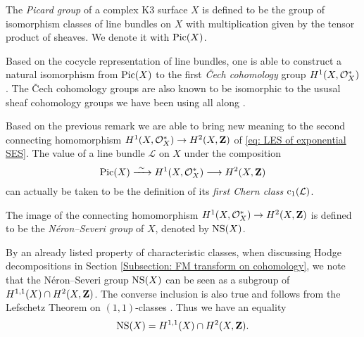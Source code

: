 \begin{definition}
    The \emph{Picard group} of a complex K3 surface $X$ is defined to be the group of isomorphism classes of line bundles on $X$ with multiplication given by the tensor product of sheaves. We denote it with $\operatorname{Pic}(X)$.
\end{definition}

\begin{remark}
    Based on the cocycle representation of line bundles, one is able to construct a natural isomorphism from $\operatorname{Pic}(X)$ to the first \emph{Čech cohomology} group $H^1(X,\mathcal O_X^*)$ \cite[\S 4, Theorem 4.49]{Voisin2002}.
    The Čech cohomology groups are also known to be isomorphic to the ususal sheaf cohomology groups we have been using all along \cite[\S 4, Theorem 4.44]{Voisin2002}.
\end{remark}

Based on the previous remark we are able to bring new meaning to the second connecting homomorphism $H^{1}(X, \mathcal O_X^*) \to H^{2}(X, \mathbf Z)$ of \eqref{eq: LES of exponential SES}. 
The value of a line bundle $\mathcal L$ on $X$ under the composition
\[
    \operatorname{Pic}(X) \xrightarrow{\ \sim \ } H^{1}(X, \mathcal O_X^*) \longrightarrow H^{2}(X, \mathbf Z)
\]
can actually be taken to be the definition of its \emph{first Chern class} $\cclass[1]{\mathcal L}$.
\begin{definition}
    The image of the connecting homomorphism $H^{1}(X, \mathcal O_X^*) \to H^{2}(X, \mathbf Z)$ is defined to be the \emph{Néron--Severi group} of $X$, denoted by $\operatorname{NS}(X)$. 
\end{definition}

\begin{remark}
    By an already listed property of characteristic classes, when discussing Hodge decompositions in Section \ref{Subsection: FM transform on cohomology}, we note that the Néron--Severi group $\operatorname{NS}(X)$ can be seen as a subgroup of $H^{1,1}(X) \cap H^{2}(X, \mathbf Z)$. The converse inclusion is also true and follows from the Lefschetz Theorem on $(1,1)$-classes \cite[\S 1.2]{GriffithsHarris1994}. Thus we have an equality
    \begin{equation}
        \label{eq: NS = 1,1 cap 2nd coh}
        \operatorname{NS}(X) = H^{1,1}(X) \cap H^{2}(X, \mathbf Z).
    \end{equation}
\end{remark}

